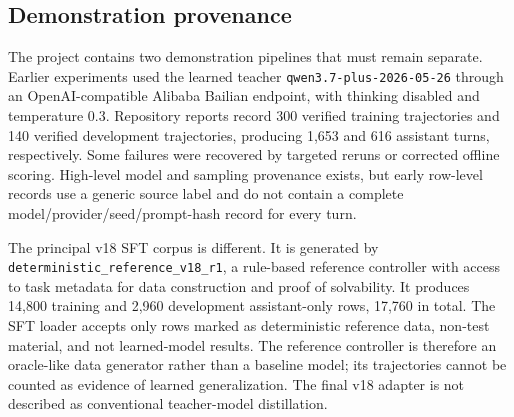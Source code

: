 \documentclass[11pt]{article}
\begin{document}
\begin{table}[t]
\centering
\caption{Principal data and evaluation artifacts. ``Development decisions'' includes controller iteration or evaluator debugging, and therefore prevents a held-out interpretation.}
\label{tab:data}
\scriptsize
{}
\end{table}

\subsection{Demonstration provenance}

The project contains two demonstration pipelines that must remain separate. Earlier experiments used the learned teacher \texttt{qwen3.7-plus-2026-05-26} through an OpenAI-compatible Alibaba Bailian endpoint, with thinking disabled and temperature 0.3. Repository reports record 300 verified training trajectories and 140 verified development trajectories, producing 1,653 and 616 assistant turns, respectively. Some failures were recovered by targeted reruns or corrected offline scoring. High-level model and sampling provenance exists, but early row-level records use a generic source label and do not contain a complete model/provider/seed/prompt-hash record for every turn.

The principal v18 SFT corpus is different. It is generated by \texttt{deterministic\_reference\_v18\_r1}, a rule-based reference controller with access to task metadata for data construction and proof of solvability. It produces 14,800 training and 2,960 development assistant-only rows, 17,760 in total. The SFT loader accepts only rows marked as deterministic reference data, non-test material, and not learned-model results. The reference controller is therefore an oracle-like data generator rather than a baseline model; its trajectories cannot be counted as evidence of learned generalization. The final v18 adapter is not described as conventional teacher-model distillation.
\end{document}
